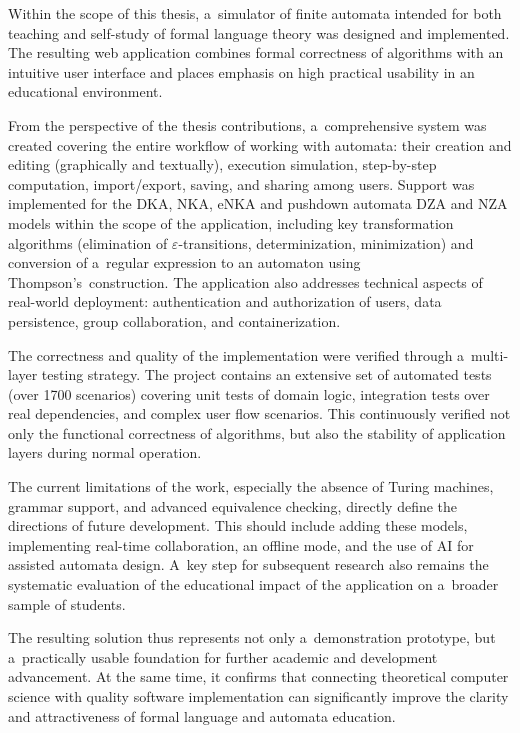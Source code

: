 \documentclass[
  master,
  program=ainfvs,
  printversion,
  figures=false,
  tables=false,
  glossaries,
  index
]{kidiplom}
\begin{document}
\begin{kiconclusions}[english]
Within the scope of this thesis, a~simulator of finite automata intended for both teaching and self-study of formal language theory was designed and implemented. The resulting web application combines formal correctness of algorithms with an intuitive user interface and places emphasis on high practical usability in an educational environment.

From the perspective of the thesis contributions, a~comprehensive system was created covering the entire workflow of working with automata: their creation and editing (graphically and textually), execution simulation, step-by-step computation, import/export, saving, and sharing among users. Support was implemented for the \gls{DKA}, \gls{NKA}, \gls{eNKA} and pushdown automata \gls{DZA} and \gls{NZA} models within the scope of the application, including key transformation algorithms (elimination of $\varepsilon$-transitions, determinization, minimization) and conversion of a~regular expression to an automaton using Thompson's~construction. The application also addresses technical aspects of real-world deployment: authentication and authorization of users, data persistence, group collaboration, and containerization.

The correctness and quality of the implementation were verified through a~multi-layer testing strategy. The project contains an extensive set of automated tests (over 1700 scenarios) covering unit tests of domain logic, integration tests over real dependencies, and complex user flow scenarios. This continuously verified not only the functional correctness of algorithms, but also the stability of application layers during normal operation.

The current limitations of the work, especially the absence of Turing machines, grammar support, and advanced equivalence checking, directly define the directions of future development. This should include adding these models, implementing real-time collaboration, an offline mode, and the use of AI for assisted automata design. A~key step for subsequent research also remains the systematic evaluation of the educational impact of the application on a~broader sample of students.

The resulting solution thus represents not only a~demonstration prototype, but a~practically usable foundation for further academic and development advancement. At the same time, it confirms that connecting theoretical computer science with quality software implementation can significantly improve the clarity and attractiveness of formal language and automata education.
\end{kiconclusions}
\end{document}
